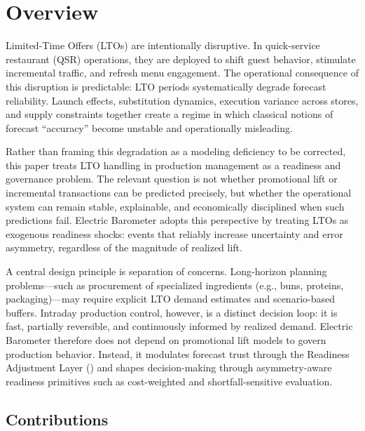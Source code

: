 
\section{Overview}
\label{sec:overview}

Limited-Time Offers (LTOs) are intentionally disruptive. In quick-service restaurant (QSR)
operations, they are deployed to shift guest behavior, stimulate incremental traffic, and refresh
menu engagement. The operational consequence of this disruption is predictable: LTO periods
systematically degrade forecast reliability. Launch effects, substitution dynamics, execution
variance across stores, and supply constraints together create a regime in which classical notions of
forecast ``accuracy'' become unstable and operationally misleading.

Rather than framing this degradation as a modeling deficiency to be corrected, this paper treats
LTO handling in production management as a readiness and governance problem. The relevant
question is not whether promotional lift or incremental transactions can be predicted precisely, but
whether the operational system can remain stable, explainable, and economically disciplined when
such predictions fail. Electric Barometer adopts this perspective by treating LTOs as exogenous
readiness shocks: events that reliably increase uncertainty and error asymmetry, regardless of the
magnitude of realized lift.

A central design principle is separation of concerns. Long-horizon planning problems—such as
procurement of specialized ingredients (e.g., buns, proteins, packaging)—may require explicit LTO
demand estimates and scenario-based buffers. Intraday production control, however, is a distinct
decision loop: it is fast, partially reversible, and continuously informed by realized demand.
Electric Barometer therefore does not depend on promotional lift models to govern production
behavior. Instead, it modulates forecast trust through the Readiness Adjustment Layer (\RAL{}) and
shapes decision-making through asymmetry-aware readiness primitives such as cost-weighted and
shortfall-sensitive evaluation.

\subsection{Contributions}
\label{subsec:contributions}

